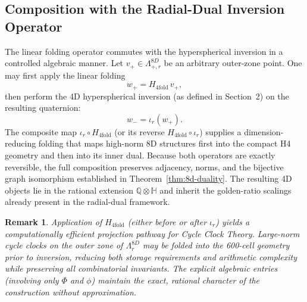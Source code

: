 \documentclass{article}
\newtheorem{remark}{Remark}
\begin{document}
\subsection{Composition with the Radial-Dual Inversion Operator}
The linear folding operator commutes with the hyperspherical inversion in a controlled algebraic manner. Let \(v_+ \in \Lambda_{+,r}^{8D}\) be an arbitrary outer-zone point. One may first apply the linear folding
\[
w_+ = H_{4\mathrm{fold}} \, v_+,
\]
then perform the 4D hyperspherical inversion (as defined in Section~2) on the resulting quaternion:
\[
w_- = \iota_r(w_+).
\]
The composite map \(\iota_r \circ H_{4\mathrm{fold}}\) (or its reverse \(H_{4\mathrm{fold}} \circ \iota_r\)) supplies a dimension-reducing folding that maps high-norm 8D structures first into the compact H4 geometry and then into its inner dual. Because both operators are exactly reversible, the full composition preserves adjacency, norms, and the bijective graph isomorphism established in Theorem~\ref{thm:8d-duality}. The resulting 4D objects lie in the rational extension \(\mathbb{Q} \otimes \mathbb{H}\) and inherit the golden-ratio scalings already present in the radial-dual framework.
\begin{remark}
Application of \(H_{4\mathrm{fold}}\) (either before or after \(\iota_r\)) yields a computationally efficient projection pathway for Cycle Clock Theory. Large-norm cycle clocks on the outer zone of \(\Lambda_r^{8D}\) may be folded into the 600-cell geometry prior to inversion, reducing both storage requirements and arithmetic complexity while preserving all combinatorial invariants. The explicit algebraic entries (involving only \(\Phi\) and \(\phi\)) maintain the exact, rational character of the construction without approximation.
\end{remark}
\end{document}
